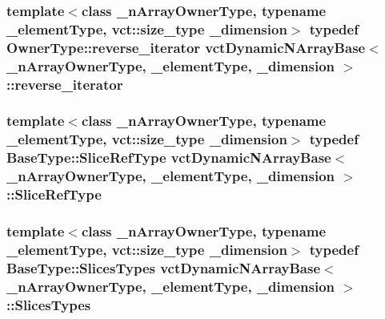 \hypertarget{classvct_dynamic_n_array_base_a4a0adcb47fb464b8dd1a1e2495a52468}{
\subsubsection[{reverse\-\_\-iterator}]{\setlength{\rightskip}{0pt plus 5cm}template$<$class \-\_\-n\-Array\-Owner\-Type, typename \-\_\-element\-Type, vct\-::size\-\_\-type \-\_\-dimension$>$ typedef Owner\-Type\-::reverse\-\_\-iterator {\bf vct\-Dynamic\-N\-Array\-Base}$<$ \-\_\-n\-Array\-Owner\-Type, \-\_\-element\-Type, \-\_\-dimension $>$\-::{\bf reverse\-\_\-iterator}}}\label{classvct_dynamic_n_array_base_a4a0adcb47fb464b8dd1a1e2495a52468}
\hypertarget{classvct_dynamic_n_array_base_aca69a8c3c62f1db0703198aa955d6157}{
\subsubsection[{Slice\-Ref\-Type}]{\setlength{\rightskip}{0pt plus 5cm}template$<$class \-\_\-n\-Array\-Owner\-Type, typename \-\_\-element\-Type, vct\-::size\-\_\-type \-\_\-dimension$>$ typedef {\bf Base\-Type\-::\-Slice\-Ref\-Type} {\bf vct\-Dynamic\-N\-Array\-Base}$<$ \-\_\-n\-Array\-Owner\-Type, \-\_\-element\-Type, \-\_\-dimension $>$\-::{\bf Slice\-Ref\-Type}}}\label{classvct_dynamic_n_array_base_aca69a8c3c62f1db0703198aa955d6157}
\hypertarget{classvct_dynamic_n_array_base_a4f034b6fdba4c573c4f5da7cb913fb54}{
\subsubsection[{Slices\-Types}]{\setlength{\rightskip}{0pt plus 5cm}template$<$class \-\_\-n\-Array\-Owner\-Type, typename \-\_\-element\-Type, vct\-::size\-\_\-type \-\_\-dimension$>$ typedef {\bf Base\-Type\-::\-Slices\-Types} {\bf vct\-Dynamic\-N\-Array\-Base}$<$ \-\_\-n\-Array\-Owner\-Type, \-\_\-element\-Type, \-\_\-dimension $>$\-::{\bf Slices\-Types}}}\label{classvct_dynamic_n_array_base_a4f034b6fdba4c573c4f5da7cb913fb54}
